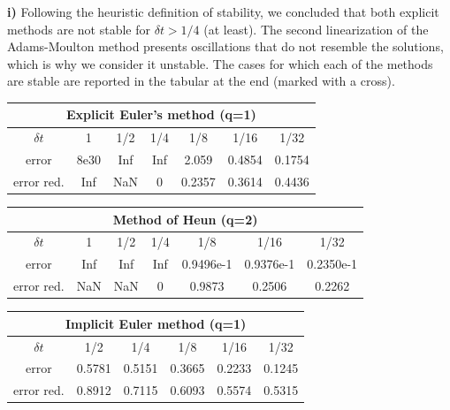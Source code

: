 \documentclass[a4paper,10pt]{article}
\begin{document}
\textbf{i) } Following the heuristic definition of stability, we concluded that both explicit methods are not stable for $\delta t > 1/4$ (at least). The second linearization of the Adams-Moulton method presents oscillations that do not resemble the solutions, which is why we consider it unstable. The cases for which each of the methods are stable are reported in the tabular at the end (marked with a cross).

\begin{center}

\addtolength{\tabcolsep}{10pt}
\renewcommand{\arraystretch}{2}

\begin{tabular}[0.75\textwidth]{ | c | c | c | c | c | c | c |}
		\hline
		\multicolumn{7}{|c|}{Explicit Euler's method (q=1)} \\
		\hline
		$\delta t$ & 1 & 1/2 & 1/4 & 1/8 & 1/16 & 1/32\\
		\hline
		error & 8e30 & Inf & Inf & 2.059 & 0.4854 & 0.1754\\
		\hline
		error red. & Inf & NaN & 0 & 0.2357 & 0.3614 & 0.4436\\
		\hline
\end{tabular}

\vspace{5mm}

\begin{tabular}{ | c | c | c | c | c | c | c |}
		\hline
		\multicolumn{7}{|c|}{Method of Heun (q=2)} \\
		\hline
		$\delta t$ & 1 & 1/2 & 1/4 & 1/8 & 1/16 & 1/32\\
		\hline
		error & Inf & Inf & Inf & 0.9496e-1 & 0.9376e-1 & 0.2350e-1\\
		\hline
		error red. & NaN & NaN & 0 & 0.9873 & 0.2506 & 0.2262\\
		\hline
\end{tabular}

\vspace{5mm}

\begin{tabular}{ | c | c | c | c | c | c |}
		\hline
		\multicolumn{6}{|c|}{Implicit Euler method (q=1)} \\
		\hline
		$\delta t$ & 1/2 & 1/4 & 1/8 & 1/16 & 1/32\\
		\hline
		error & 0.5781 & 0.5151 & 0.3665 & 0.2233 & 0.1245\\
		\hline
		error red. & 0.8912 & 0.7115 & 0.6093 & 0.5574 & 0.5315\\
		\hline
\end{tabular}


\end{center}
\end{document}
